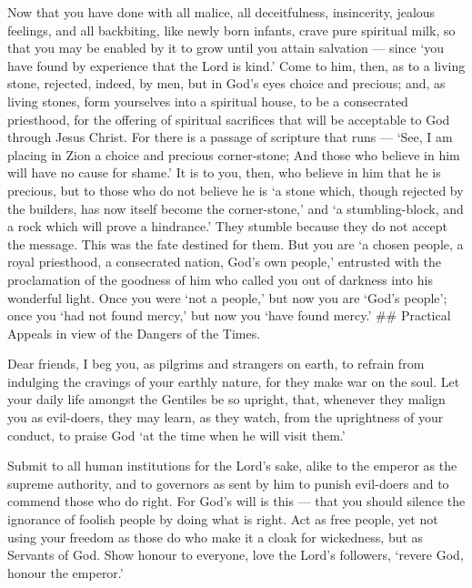  Now that you have done with all malice, all deceitfulness,
insincerity, jealous feelings, and all backbiting,  like
newly born infants, crave pure spiritual milk, so that you may be
enabled by it to grow until you attain salvation ---  since
`you have found by experience that the Lord is kind.'  Come
to him, then, as to a living stone, rejected, indeed, by men, but in
God's eyes choice and precious;  and, as living stones, form
yourselves into a spiritual house, to be a consecrated priesthood, for
the offering of spiritual sacrifices that will be acceptable to God
through Jesus Christ.  For there is a passage of scripture
that runs --- `See, I am placing in Zion a choice and precious
corner-stone; And those who believe in him will have no cause for
shame.'  It is to you, then, who believe in him that he is
precious, but to those who do not believe he is `a stone which, though
rejected by the builders, has now itself become the corner-stone,'
 and `a stumbling-block, and a rock which will prove a
hindrance.' They stumble because they do not accept the message. This
was the fate destined for them.  But you are `a chosen
people, a royal priesthood, a consecrated nation, God's own people,'
entrusted with the proclamation of the goodness of him who called you
out of darkness into his wonderful light.  Once you were
`not a people,' but now you are `God's people'; once you `had not found
mercy,' but now you `have found mercy.' \#\# Practical Appeals in view
of the Dangers of the Times.

 Dear friends, I beg you, as pilgrims and strangers on
earth, to refrain from indulging the cravings of your earthly nature,
for they make war on the soul.  Let your daily life amongst
the Gentiles be so upright, that, whenever they malign you as
evil-doers, they may learn, as they watch, from the uprightness of your
conduct, to praise God `at the time when he will visit them.'

 Submit to all human institutions for the Lord's sake,
alike to the emperor as the supreme authority,  and to
governors as sent by him to punish evil-doers and to commend those who
do right.  For God's will is this --- that you should
silence the ignorance of foolish people by doing what is right.
 Act as free people, yet not using your freedom as those do
who make it a cloak for wickedness, but as Servants of God.
 Show honour to everyone, love the Lord's followers,
`revere God, honour the emperor.'

